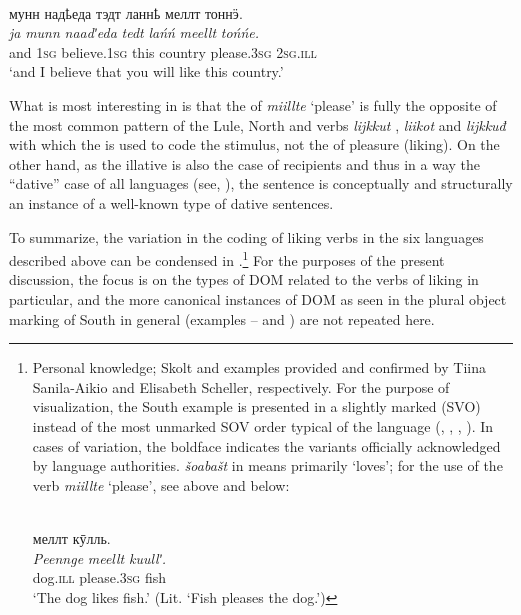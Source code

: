\documentclass[output=paper]{LSP/langsci}
\begin{document}
\begin{exe}
\ex%
\label{16-ki-ex:18}
\\
 {мунн} {надҍеда} {тэдт} {ланнҍ} {меллт} {тонн\"э}.\\
\textit{ja} \textit{munn} \textit{naadʹeda} \textit{tedt} \textit{lańń} \textit{meellt} \textit{tońńe.}\\
and \textsc{1sg} believe.\textsc{1sg} this country please.\textsc{3sg} \textsc{2sg}.\textsc{ill}\\
\glt ‘and I believe that you will like this country.’
\end{exe}


What is most interesting in  is that the  of \textit{miillte} ‘please’  is fully the opposite of the most common pattern of the Lule, North and   verbs \textit{lijkkut} , \textit{liikot}  and \textit{lijkkuđ}  with which the  is used to code the stimulus, not the  of pleasure (liking). On the other hand, as the illative is also the case of recipients and thus in a way the “dative” case of all  languages (see, \eg {}), the  sentence  is conceptually and structurally an instance of a well-known type of dative  sentences.

To summarize, the variation in the coding of liking verbs in the six  languages described above can be condensed in .\footnote{Personal knowledge; Skolt  and  examples provided and confirmed by Tiina Sanila-Aikio and Elisabeth Scheller, respectively. For the purpose of visualization, the South  example is presented in a slightly marked  (SVO) instead of the most unmarked SOV order typical of the language (\cf {}, , , ). In cases of variation, the boldface indicates the variants officially acknowledged by language authorities.  \textit{šoabašt} in  means primarily ‘loves’; for the use of the verb \textit{miillte} ‘please’, see  above and  below:

\ea
\label{16-ki-ex:iii}
\\
 {меллт} {к{\=у}лль.}\\
\textit{Peennge} \textit{meellt} \textit{kuullʹ.}\\
 dog.\textsc{ill} please.\textsc{3sg} fish\\
\glt ‘The dog likes fish.’ (Lit. ‘Fish pleases the dog.’)
\z
} 
For the purposes of the present discussion, the focus is on the types of DOM related to the verbs of liking in particular, and the more canonical instances of DOM as seen in the plural object marking of South  in general (examples -- and ) are not repeated here.
\end{document}
